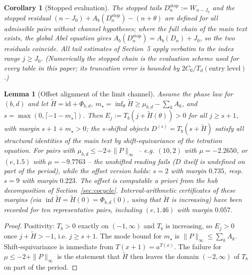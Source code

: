 \documentclass[11pt,a4paper]{article}
\theoremstyle{plain}
\newtheorem{lemma}[theorem]{Lemma}
\newtheorem{corollary}[theorem]{Corollary}
\theoremstyle{definition}
\theoremstyle{remark}
\begin{document}
\begin{corollary}[Stopped evaluation]\label{cor:D-stopped}
The stopped tails $D_n^{\mathrm{stop}}:=W_{n-J_0}$ and the stopped residual
$(n-J_0)+A_b(D_n^{\mathrm{stop}})-(n+\theta)$ are defined for all
admissible pairs without channel hypotheses; where the full chain of the
main text exists, the global Abel equation gives
$A_b(D_n^{\mathrm{stop}})=A_b(D_n)+J_0$, so the two residuals coincide.
All tail estimates of Section~5 apply verbatim to the index range
$j\ge J_0$.  (Numerically the stopped chain \emph{is} the evaluation
scheme used for every table in this paper; its truncation error is bounded
by $2C_0/T_d(\text{entry level})$.)
\end{corollary}

\begin{lemma}[Offset alignment of the limit channel]\label{lem:D-offset}
Assume the phase law for $(b,d)$ and let $\widetilde H=\mathrm{id}+
\Phi_{b,d}$, $m_\star=\inf_\theta\widetilde H\ge\mu_{b,d}-\sum_k A_k$, and
$s=\max(0,\lceil-1-m_\star\rceil)$.  Then $E_j:=T_b(j+\widetilde H(\theta))
>0$ for all $j\ge s+1$, with margin $s+1+m_\star>0$; the $s$-shifted
objects $D^{(s)}=T_b(s+\widetilde H)$ satisfy all structural identities of
the main text by shift-equivariance of the tetration equation.  For pairs
with $\mu_{b,d}\le-2+\|P\|_\infty$ -- e.g. $(10,2)$ with $\mu=-2.2650$, or
$(e,1.5)$ with $\mu=-9.7763$ -- the \emph{unshifted} reading fails ($D$
itself is undefined on part of the period), while the offset version holds:
$s=2$ with margin $0.735$, resp. $s=9$ with margin $0.223$.  The offset is
computable a priori from the hub decomposition of
Section~\ref{sec:cocycle}.  Interval-arithmetic certificates of these
margins (via $\inf\widetilde H=\widetilde H(0)=\Phi_{b,d}(0)$, using that
$\widetilde H$ is increasing) have been recorded for ten representative
pairs, including $(e,1.46)$ with margin $0.057$.
\end{lemma}

\begin{proof}
Positivity: $T_b>0$ exactly on $(-1,\infty)$ and $T_b$ is increasing, so
$E_j>0$ once $j+\widetilde H>-1$, i.e. $j\ge s+1$.  The mode bound for
$m_\star$ is $\|P\|_\infty\le\sum_k A_k$.  Shift-equivariance is immediate
from $T(x+1)=a^{T(x)}$.  The failure for $\mu\le-2+\|P\|_\infty$ is the
statement that $\widetilde H$ then leaves the domain $(-2,\infty)$ of
$T_b$ on part of the period.
\end{proof}
\end{document}
